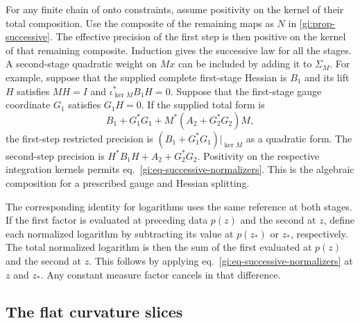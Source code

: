 \documentclass[11pt,letterpaper,reqno]{amsart}
\numberwithin{equation}{section}
\renewcommand{\eqref}[1]{\textup{eq.~\ref{#1}}}
\theoremstyle{definition}
\theoremstyle{remark}
\begin{document}
For any finite chain of onto constraints, assume positivity on
the kernel of their total composition. Use the composite of
the remaining maps as \(N\) in \cref{gi:prop-successive}.
The effective precision of the first step is then positive on
the kernel of that remaining composite. Induction gives the
successive law for all the stages. A second-stage
quadratic weight on \(Mx\) can be included by adding it
to \(\Sigma_M\). For example, suppose that the supplied
complete first-stage Hessian is \(B_1\) and its lift \(H\)
satisfies \(MH=I\) and \(\iota_{\ker M}^*B_1H=0\).
Suppose that the first-stage gauge coordinate \(G_1\)
satisfies \(G_1H=0\). If the supplied total form is
\[
 B_1+G_1^*G_1+M^*(A_2+G_2^*G_2)M,
\]
the first-step restricted precision is
\((B_1+G_1^*G_1)|_{\ker M}\) as a quadratic form.
The second-step precision is \(H^*B_1H+A_2+G_2^*G_2\).
Positivity on the respective integration kernels permits
\eqref{gi:eq-successive-normalizers}. This is the algebraic
composition for a prescribed gauge and Hessian splitting.

The corresponding identity for logarithms uses the same
reference at both stages. If the first factor is evaluated
at preceding data \(p(z)\) and the second at \(z\), define
each normalized logarithm by subtracting its value at
\(p(z_*)\) or \(z_*\), respectively. The total normalized
logarithm is then the sum of the first evaluated at
\(p(z)\) and the second at \(z\). This follows by applying
\eqref{gi:eq-successive-normalizers} at \(z\) and \(z_*\).
Any constant measure factor cancels in that difference.

\subsection{The flat curvature slices}
\label{gi:sec-free-slices}
\end{document}
